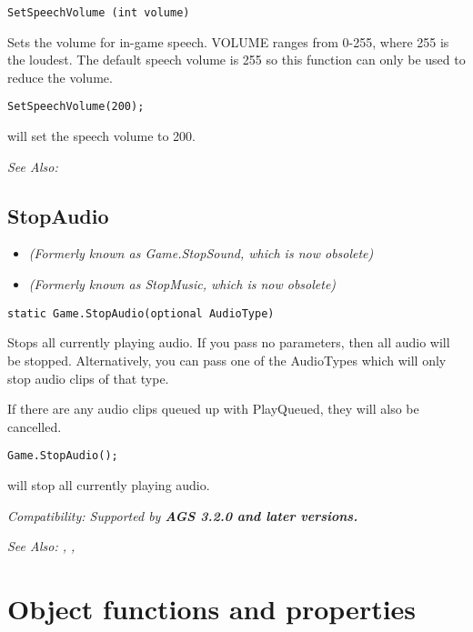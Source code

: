 \begin{verbatim}
SetSpeechVolume (int volume)
\end{verbatim}
Sets the volume for in-game speech. VOLUME ranges from 0-255, where 255 is
the loudest. The default speech volume is 255 so this function can only
be used to reduce the volume.

\begin{verbatim}
SetSpeechVolume(200);
\end{verbatim}
will set the speech volume to 200.

\it{See Also:} 


\subsection{StopAudio}\label{Game.StopAudio}%

\begin{itemize}
\item \it{(Formerly known as Game.StopSound, which is now obsolete)}
\item \it{(Formerly known as StopMusic, which is now obsolete)}
\end{itemize}

\begin{verbatim}
static Game.StopAudio(optional AudioType)
\end{verbatim}
Stops all currently playing audio. If you pass no parameters, then all audio will be stopped.
Alternatively, you can pass one of the AudioTypes which will only stop audio clips of that
type.

If there are any audio clips queued up with PlayQueued, they will also be cancelled.

\begin{verbatim}
Game.StopAudio();
\end{verbatim}
will stop all currently playing audio.

\it{Compatibility:} Supported by \bf{AGS 3.2.0} and later versions.

\it{See Also:} , ,


\section{Object functions and properties}%


